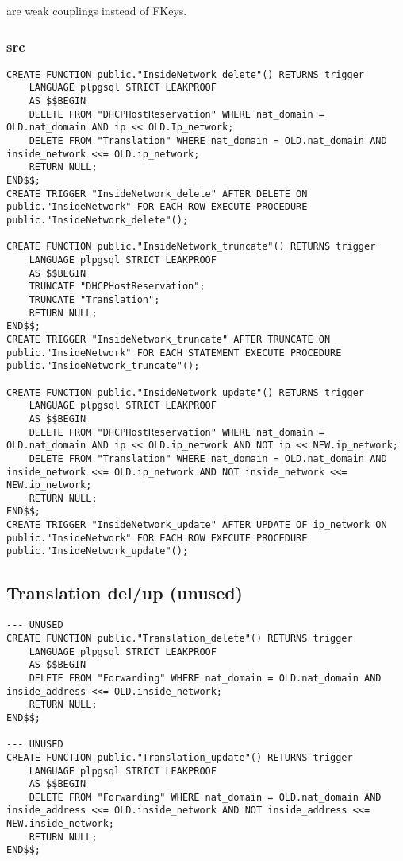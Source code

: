 \documentclass[11pt]{article}
\begin{document}
are weak couplings instead of FKeys.

\subsubsection{src}
\label{sec:org3633ba4}
\begin{verbatim}
CREATE FUNCTION public."InsideNetwork_delete"() RETURNS trigger
    LANGUAGE plpgsql STRICT LEAKPROOF
    AS $$BEGIN
	DELETE FROM "DHCPHostReservation" WHERE nat_domain = OLD.nat_domain AND ip << OLD.Ip_network;
	DELETE FROM "Translation" WHERE nat_domain = OLD.nat_domain AND inside_network <<= OLD.ip_network;
	RETURN NULL;
END$$;
CREATE TRIGGER "InsideNetwork_delete" AFTER DELETE ON public."InsideNetwork" FOR EACH ROW EXECUTE PROCEDURE public."InsideNetwork_delete"();

CREATE FUNCTION public."InsideNetwork_truncate"() RETURNS trigger
    LANGUAGE plpgsql STRICT LEAKPROOF
    AS $$BEGIN
	TRUNCATE "DHCPHostReservation";
	TRUNCATE "Translation";
	RETURN NULL;
END$$;
CREATE TRIGGER "InsideNetwork_truncate" AFTER TRUNCATE ON public."InsideNetwork" FOR EACH STATEMENT EXECUTE PROCEDURE public."InsideNetwork_truncate"();

CREATE FUNCTION public."InsideNetwork_update"() RETURNS trigger
    LANGUAGE plpgsql STRICT LEAKPROOF
    AS $$BEGIN
	DELETE FROM "DHCPHostReservation" WHERE nat_domain = OLD.nat_domain AND ip << OLD.ip_network AND NOT ip << NEW.ip_network;
	DELETE FROM "Translation" WHERE nat_domain = OLD.nat_domain AND inside_network <<= OLD.ip_network AND NOT inside_network <<= NEW.ip_network;
	RETURN NULL;
END$$;
CREATE TRIGGER "InsideNetwork_update" AFTER UPDATE OF ip_network ON public."InsideNetwork" FOR EACH ROW EXECUTE PROCEDURE public."InsideNetwork_update"();
\end{verbatim}

\subsection{Translation del/up (unused)}
\label{sec:org06d28b8}
\begin{verbatim}
--- UNUSED
CREATE FUNCTION public."Translation_delete"() RETURNS trigger
    LANGUAGE plpgsql STRICT LEAKPROOF
    AS $$BEGIN
	DELETE FROM "Forwarding" WHERE nat_domain = OLD.nat_domain AND inside_address <<= OLD.inside_network;
	RETURN NULL;
END$$;

--- UNUSED
CREATE FUNCTION public."Translation_update"() RETURNS trigger
    LANGUAGE plpgsql STRICT LEAKPROOF
    AS $$BEGIN
	DELETE FROM "Forwarding" WHERE nat_domain = OLD.nat_domain AND inside_address <<= OLD.inside_network AND NOT inside_address <<= NEW.inside_network;
	RETURN NULL;
END$$;
\end{verbatim}
\end{document}
